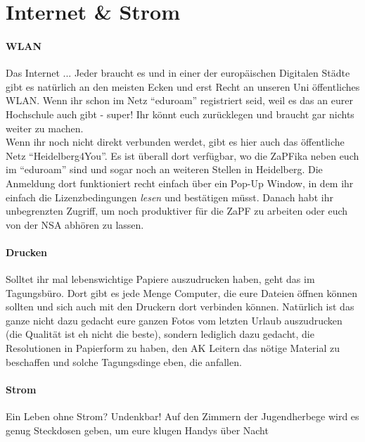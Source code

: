 \section{Internet \& Strom}
  \paragraph{WLAN}
  Das Internet ... Jeder braucht es und in einer der europäischen Digitalen Städte gibt es natürlich an den meisten Ecken und erst Recht an unseren Uni
  öffentliches WLAN. Wenn ihr schon im Netz ``eduroam'' registriert seid, weil es das an eurer Hochschule auch gibt - super!
  Ihr könnt euch zurücklegen und braucht gar nichts weiter zu machen. \\
  Wenn ihr noch nicht direkt verbunden werdet, gibt es hier auch das öffentliche Netz ``Heidelberg4You''.
  Es ist überall dort verfügbar, wo die ZaPFika neben euch im ``eduroam'' sind und sogar noch an weiteren Stellen in Heidelberg.
  Die Anmeldung dort funktioniert recht einfach über ein Pop-Up Window, in dem ihr einfach die Lizenzbedingungen \textit{lesen} und bestätigen müsst.
  Danach habt ihr unbegrenzten Zugriff, um noch produktiver für die ZaPF zu arbeiten oder euch von der NSA abhören zu lassen. \\

  \paragraph{Drucken}
  Solltet ihr mal lebenswichtige Papiere auszudrucken haben, geht das im Tagungsbüro. Dort gibt es jede Menge Computer, die eure Dateien
  öffnen können sollten und sich auch mit den Druckern dort verbinden können.
  Natürlich ist das ganze nicht dazu gedacht eure ganzen Fotos vom letzten Urlaub auszudrucken (die Qualität ist eh nicht die beste),
  sondern lediglich dazu gedacht, die Resolutionen in Papierform zu haben, den AK Leitern das nötige Material zu beschaffen und solche
  Tagungsdinge eben, die anfallen.

  \paragraph{Strom}
  Ein Leben ohne Strom? Undenkbar! 
  Auf den Zimmern der Jugendherbege wird es genug Steckdosen geben, um eure klugen Handys über Nacht

